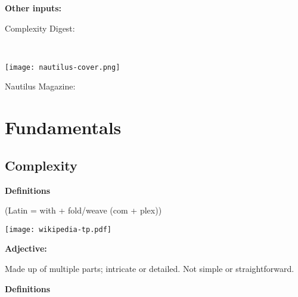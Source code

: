   



  \textbf{Other inputs:}

  
    
    
      Complexity Digest:
      
      {\small
        \\
      }
    
          
      
      
\begin{marginfigure}[]
\texttt{[image: nautilus-cover.png]}
\end{marginfigure}

      
      
       
        Nautilus Magazine: 
      
      






\section{Fundamentals}

\subsection{Complexity}

  \textbf{Definitions}

   (Latin = with + fold/weave (com + plex))
  \hfill
  
\begin{marginfigure}[]
\texttt{[image: wikipedia-tp.pdf]}
\end{marginfigure}


  \medskip

  \textbf{Adjective:}
    
     Made up of multiple parts; intricate or detailed.
     Not simple or straightforward.
    
  



  \textbf{Definitions}

